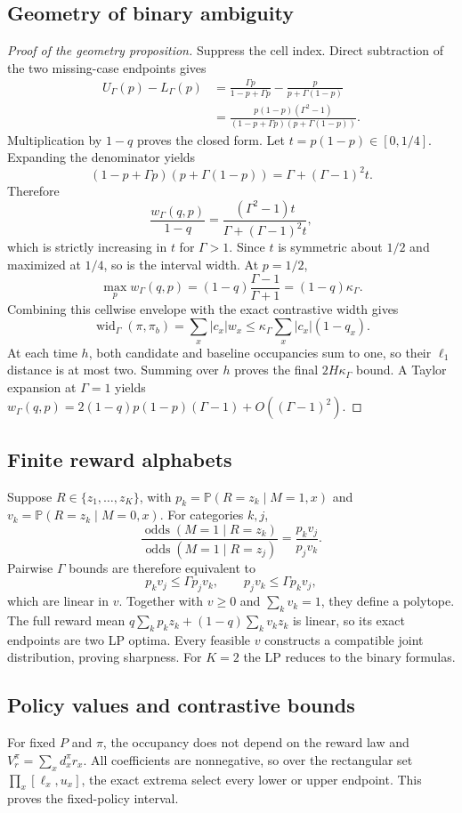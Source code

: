 \documentclass[letterpaper]{article}
\newcommand{\Prb}{\mathbb{P}}
\newcommand{\odds}{\operatorname{odds}}
\begin{document}
\subsection{Geometry of binary ambiguity}
\begin{proof}[Proof of the geometry proposition]
Suppress the cell index. Direct subtraction of the two missing-case endpoints gives
\begin{align*}
U_\Gamma(p)-L_\Gamma(p)
&=\frac{\Gamma p}{1-p+\Gamma p}
  -\frac{p}{p+\Gamma(1-p)}\\
&=\frac{p(1-p)(\Gamma^2-1)}
{(1-p+\Gamma p)(p+\Gamma(1-p))}.
\end{align*}
Multiplication by $1-q$ proves the closed form. Let $t=p(1-p)\in[0,1/4]$. Expanding the denominator yields
\[
(1-p+\Gamma p)(p+\Gamma(1-p))
=\Gamma+(\Gamma-1)^2t.
\]
Therefore
\[
\frac{w_\Gamma(q,p)}{1-q}
=\frac{(\Gamma^2-1)t}{\Gamma+(\Gamma-1)^2t},
\]
which is strictly increasing in $t$ for $\Gamma>1$. Since $t$ is symmetric about $1/2$ and maximized at $1/4$, so is the interval width. At $p=1/2$,
\[
\max_p w_\Gamma(q,p)
=(1-q)\frac{\Gamma-1}{\Gamma+1}
=(1-q)\kappa_\Gamma.
\]
Combining this cellwise envelope with the exact contrastive width gives
\[
\operatorname{wid}_\Gamma(\pi,\pi_b)
=\sum_x|c_x|w_x
\leq\kappa_\Gamma\sum_x|c_x|(1-q_x).
\]
At each time $h$, both candidate and baseline occupancies sum to one, so their $\ell_1$ distance is at most two. Summing over $h$ proves the final $2H\kappa_\Gamma$ bound. A Taylor expansion at $\Gamma=1$ yields
$w_\Gamma(q,p)=2(1-q)p(1-p)(\Gamma-1)+O((\Gamma-1)^2)$.
\end{proof}

\subsection{Finite reward alphabets}
Suppose $R\in\{z_1,\ldots,z_K\}$, with
$p_k=\Prb(R=z_k\mid M=1,x)$ and
$v_k=\Prb(R=z_k\mid M=0,x)$. For categories $k,j$,
\[
\frac{\odds(M=1\mid R=z_k)}{\odds(M=1\mid R=z_j)}
=\frac{p_kv_j}{p_jv_k}.
\]
Pairwise $\Gamma$ bounds are therefore equivalent to
\[
p_kv_j\leq\Gamma p_jv_k,
\qquad p_jv_k\leq\Gamma p_kv_j,
\]
which are linear in $v$. Together with $v\geq0$ and $\sum_kv_k=1$, they define a polytope. The full reward mean
$q\sum_kp_kz_k+(1-q)\sum_kv_kz_k$
is linear, so its exact endpoints are two LP optima. Every feasible $v$ constructs a compatible joint distribution, proving sharpness. For $K=2$ the LP reduces to the binary formulas.

\subsection{Policy values and contrastive bounds}
For fixed $P$ and $\pi$, the occupancy does not depend on the reward law and
$V_r^\pi=\sum_xd_x^\pi r_x$. All coefficients are nonnegative, so over the rectangular set $\prod_x[\ell_x,u_x]$, the exact extrema select every lower or upper endpoint. This proves the fixed-policy interval.
\end{document}
